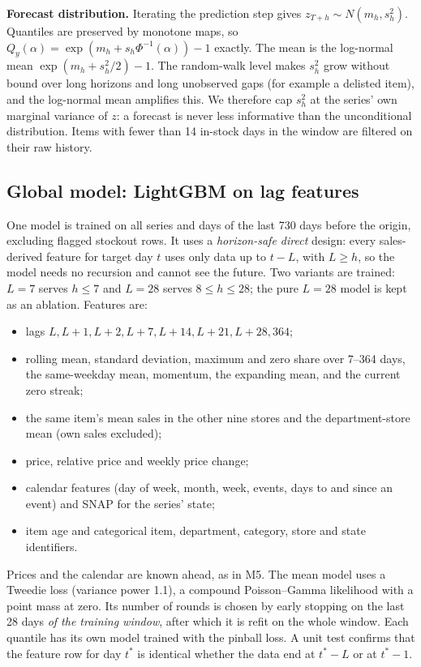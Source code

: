 \documentclass[conference]{IEEEtran}
\begin{document}
\textbf{Forecast distribution.} Iterating the prediction step gives $z_{T+h}\sim N(m_h,s_h^2)$. Quantiles are preserved by monotone maps, so $Q_y(\alpha)=\exp(m_h+s_h\Phi^{-1}(\alpha))-1$ exactly. The mean is the log-normal mean $\exp(m_h+s_h^2/2)-1$. The random-walk level makes $s_h^2$ grow without bound over long horizons and long unobserved gaps (for example a delisted item), and the log-normal mean amplifies this. We therefore cap $s_h^2$ at the series' own marginal variance of $z$: a forecast is never less informative than the unconditional distribution. Items with fewer than 14 in-stock days in the window are filtered on their raw history.

\subsection{Global model: LightGBM on lag features}
One model is trained on all series and days of the last 730 days before the origin, excluding flagged stockout rows. It uses a \emph{horizon-safe direct} design: every sales-derived feature for target day $t$ uses only data up to $t-L$, with $L\ge h$, so the model needs no recursion and cannot see the future. Two variants are trained: $L=7$ serves $h\le7$ and $L=28$ serves $8\le h\le28$; the pure $L=28$ model is kept as an ablation. Features are:
\begin{itemize}
\item lags $L, L{+}1, L{+}2, L{+}7, L{+}14, L{+}21, L{+}28, 364$;
\item rolling mean, standard deviation, maximum and zero share over 7--364 days, the same-weekday mean, momentum, the expanding mean, and the current zero streak;
\item the same item's mean sales in the other nine stores and the department-store mean (own sales excluded);
\item price, relative price and weekly price change;
\item calendar features (day of week, month, week, events, days to and since an event) and SNAP for the series' state;
\item item age and categorical item, department, category, store and state identifiers.
\end{itemize}
Prices and the calendar are known ahead, as in M5. The mean model uses a Tweedie loss (variance power 1.1), a compound Poisson--Gamma likelihood with a point mass at zero. Its number of rounds is chosen by early stopping on the last 28 days \emph{of the training window}, after which it is refit on the whole window. Each quantile has its own model trained with the pinball loss. A unit test confirms that the feature row for day $t^\ast$ is identical whether the data end at $t^\ast-L$ or at $t^\ast-1$.
\end{document}
